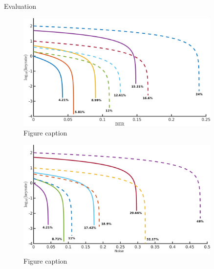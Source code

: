 \documentclass[final]{beamer}
\newlength{\sepwid}
\newlength{\onecolwid}
\newlength{\twocolwid}
\begin{document}
\begin{frame}[t]
\begin{columns}[t]
\begin{column}{\twocolwid}
\begin{columns}[t,totalwidth=\twocolwid]
\begin{column}{\onecolwid}
\begin{block}{Evaluation}


\begin{figure}
	\includegraphics[width=0.8\linewidth]{ber_v_kr_to_label_done_small.png}
	\caption{Figure caption}
\end{figure}


\begin{figure}
\includegraphics[width=0.8\linewidth]{q_v_kr_to_label_done_small.png}
\caption{Figure caption}
\end{figure}

\end{block}


\end{column} %

\end{columns} %

\end{column} %

\begin{column}{\sepwid}\end{column} %

\begin{column}{\onecolwid} %


\end{column}
\end{columns}
\end{frame}
\end{document}
